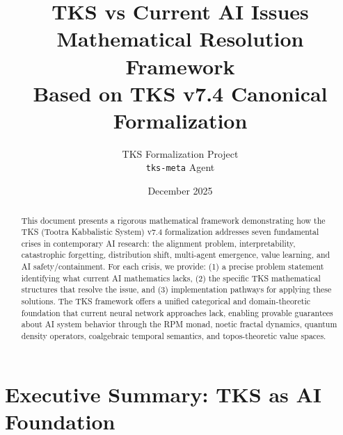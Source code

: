 \documentclass[11pt,twoside]{article}
\title{\LARGE\textbf{TKS vs Current AI Issues}\\[0.5em]
       \Large Mathematical Resolution Framework\\[0.3em]
       \normalsize Based on TKS v7.4 Canonical Formalization}
\author{TKS Formalization Project\\
        \texttt{tks-meta} Agent}
\date{December 2025}
\theoremstyle{definition}
\theoremstyle{plain}
\theoremstyle{remark}
\begin{document}
\maketitle


\begin{abstract}
This document presents a rigorous mathematical framework demonstrating how the
TKS (Tootra Kabbalistic System) v7.4 formalization addresses seven fundamental
crises in contemporary AI research: the alignment problem, interpretability,
catastrophic forgetting, distribution shift, multi-agent emergence, value learning,
and AI safety/containment. For each crisis, we provide: (1) a precise problem
statement identifying what current AI mathematics lacks, (2) the specific TKS
mathematical structures that resolve the issue, and (3) implementation pathways
for applying these solutions. The TKS framework offers a unified categorical and
domain-theoretic foundation that current neural network approaches lack, enabling
provable guarantees about AI system behavior through the RPM monad, noetic fractal
dynamics, quantum density operators, coalgebraic temporal semantics, and topos-theoretic
value spaces.
\end{abstract}

\tableofcontents

\section{Executive Summary: TKS as AI Foundation}
\label{sec:executive-summary}
\end{document}
